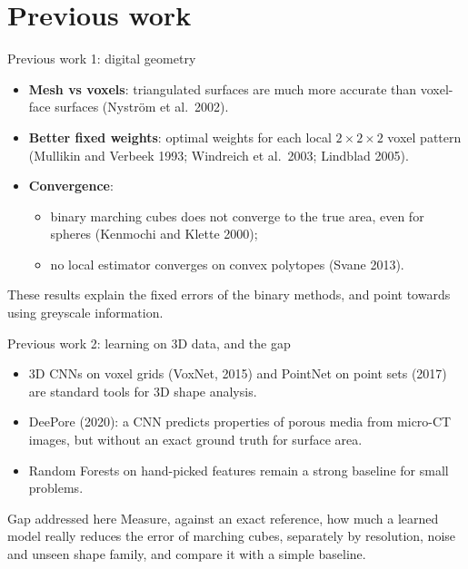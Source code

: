 \documentclass[aspectratio=169,11pt]{beamer}
\begin{document}
\section{Previous work}
\begin{frame}{Previous work 1: digital geometry}
  \begin{itemize}
    \item \textbf{Mesh vs voxels}: triangulated surfaces are much more accurate than voxel-face
          surfaces (Nystr\"om et al.\ 2002).
    \item \textbf{Better fixed weights}: optimal weights for each local $2\times2\times2$ voxel
          pattern (Mullikin and Verbeek 1993; Windreich et al.\ 2003; Lindblad 2005).
    \item \textbf{Convergence}:
          \begin{itemize}
            \item binary marching cubes does not converge to the true area, even for spheres
                  (Kenmochi and Klette 2000);
            \item no local estimator converges on convex polytopes (Svane 2013).
          \end{itemize}
  \end{itemize}
  \vspace{0.5em}
  These results explain the fixed errors of the binary methods, and point towards using greyscale
  information.
\end{frame}

\begin{frame}{Previous work 2: learning on 3D data, and the gap}
  \begin{itemize}
    \item 3D CNNs on voxel grids (VoxNet, 2015) and PointNet on point sets (2017) are standard
          tools for 3D shape analysis.
    \item DeePore (2020): a CNN predicts properties of porous media from micro-CT images, but
          without an exact ground truth for surface area.
    \item Random Forests on hand-picked features remain a strong baseline for small problems.
  \end{itemize}
  \vspace{0.5em}
  \begin{block}{Gap addressed here}
    Measure, against an exact reference, how much a learned model really reduces the error of
    marching cubes, separately by resolution, noise and unseen shape family, and compare it with a
    simple baseline.
  \end{block}
\end{frame}
\end{document}
